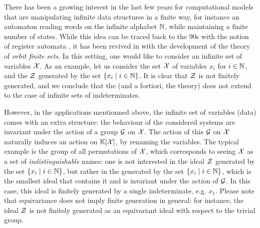 \AP There has been a growing interest in the last few years for computational
models that are manipulating infinite data structures in a finite way, for
instance an automaton reading words on the infinite alphabet $\mathbb{N}$, while
maintaining a finite number of states. While this idea can be traced back to
the 90s with the notion of register automata \cite{KAFR94}, it has been revived
in with the development of the theory of \emph{orbit finite sets}. In this
setting, one would like to consider an infinite set of variables $\mathcal{X}$. As an
example, let us consider the set $\mathcal{X}$ of variables $x_i$ for $i \in \mathbb{N}$, and
the  $\mathcal{Z}$ generated by the set $\{ x_i \mid i \in \mathbb{N} \}$. It is
clear that $\mathcal{Z}$ is not finitely generated, and we conclude that the
 (and a fortiori, the 
theory) does not extend to the case of infinite sets of indeterminates.

\AP However, in the applications mentionned above, the infinite set of
variables (data) comes with an extra structure: the behaviour of the considered
systems are invariant under the action of a group $\mathcal{G}$ on $\mathcal{X}$. The action
of this $\mathcal{G}$ on $\mathcal{X}$ naturally induces an action on $\mathbb{K}[\mathcal{X}]$, by
renaming the variables. The typical example is the group of all permutations of
$\mathcal{X}$, which corresponds to seeing $\mathcal{X}$ as a set of \emph{indistinguishable}
names: one is not interested in the ideal $\mathcal{Z}$ generated by the set
$\{ x_i \mid i \in \mathbb{N} \}$, but rather in the  generated by
the set $\{ x_i \mid i \in \mathbb{N} \}$, which is the smallest ideal that contains it
and is invariant under the action of $\mathcal{G}$. In this case, this ideal is
finitely generated by a single indeterminate, e.g. $x_1$. Please note that
equivariance does not imply finite generation in general: for instance, the
ideal $\mathcal{Z}$ is not finitely generated as an equivariant ideal with respect to
the trivial group.


